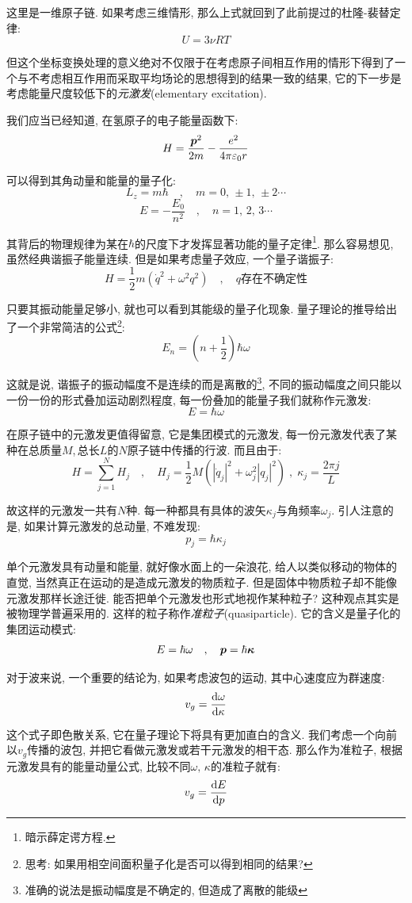 这里是一维原子链. 如果考虑三维情形, 那么上式就回到了此前提过的杜隆-裴替定律:
\[U=3\nu RT\]

但这个坐标变换处理的意义绝对不仅限于在考虑原子间相互作用的情形下得到了一个与不考虑相互作用而采取平均场论的思想得到的结果一致的结果, 它的下一步是考虑能量尺度较低下的\emph{元激发}(elementary excitation).

我们应当已经知道, 在氢原子的电子能量函数下:
\[H=\frac{\boldsymbol{p}^2}{2m}-\frac{e^2}{4\pi \varepsilon_0 r}\]

可以得到其角动量和能量的量子化:
\[L_z=m\hbar\quad ,\quad m=0,\,\pm 1,\,\pm 2\cdots\]
\[E=-\frac{E_0}{n^2}\quad ,\quad n=1,\,2,\,3\cdots\]

其背后的物理规律为某在$\hbar$的尺度下才发挥显著功能的量子定律\footnote{暗示薛定谔方程.}. 那么容易想见, 虽然经典谐振子能量连续. 但是如果考虑量子效应, 一个量子谐振子:
\[H=\frac{1}{2}m(\dot{q}^2+\omega^2 q^2)\quad ,\quad q\text{存在不确定性}\]

只要其振动能量足够小, 就也可以看到其能级的量子化现象. 量子理论的推导给出了一个非常简洁的公式\footnote{思考: 如果用相空间面积量子化是否可以得到相同的结果?}:
\[E_n=\left(n+\frac{1}{2}\right)\hbar \omega\]

这就是说, 谐振子的振动幅度不是连续的而是离散的\footnote{准确的说法是振动幅度是不确定的, 但造成了离散的能级}, 不同的振动幅度之间只能以一份一份的形式叠加运动剧烈程度, 每一份叠加的能量子我们就称作元激发:
\[E=\hbar\omega\]

在原子链中的元激发更值得留意, 它是集团模式的元激发, 每一份元激发代表了某种在总质量$M$,\,总长$L$的$N$原子链中传播的行波. 而且由于:
\[H=\sum_{j=1}^N H_j\quad ,\quad H_j=\frac{1}{2}M(|\dot{q}_j|^2+\omega_j^2 |q_j|^2)\;,\; \kappa_j=\frac{2\pi j}{L}\]

故这样的元激发一共有$N$种. 每一种都具有具体的波矢$\kappa_j$与角频率$\omega_j$. 引人注意的是, 如果计算元激发的总动量, 不难发现:
\[p_j=\hbar \kappa_j\]

单个元激发具有动量和能量, 就好像水面上的一朵浪花, 给人以类似移动的物体的直觉, 当然真正在运动的是造成元激发的物质粒子. 但是固体中物质粒子却不能像元激发那样长途迁徙. 能否把单个元激发也形式地视作某种粒子? 这种观点其实是被物理学普遍采用的. 这样的粒子称作\emph{准粒子}(quasiparticle). 它的含义是量子化的集团运动模式:
\[E=\hbar\omega\quad ,\quad \boldsymbol{p}=\hbar\boldsymbol{\kappa}\]

对于波来说, 一个重要的结论为, 如果考虑波包的运动, 其中心速度应为群速度:
\[v_g=\frac{\textrm{d} \omega}{\textrm{d} \kappa}\]

这个式子即色散关系, 它在量子理论下将具有更加直白的含义. 我们考虑一个向前以$v_g$传播的波包, 并把它看做元激发或若干元激发的相干态. 那么作为准粒子, 根据元激发具有的能量动量公式, 比较不同$\omega,\,\kappa$的准粒子就有:
\[v_g=\frac{\textrm{d} E}{\textrm{d} p}\]

